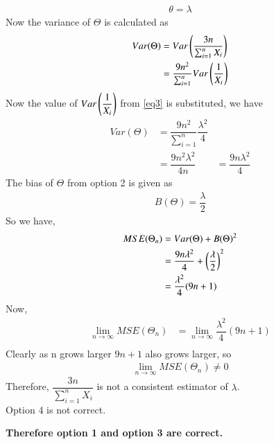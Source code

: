 \documentclass[journal,12pt,twocolumn]{IEEEtran}
\begin{document}
\begin{enumerate}
\begin{align}
     \theta = \lambda
 \end{align}
Now the variance of $ \Theta$ is calculated as
\begin{align}
    Var(\Theta) &= Var\left(\dfrac{3n}{\sum_{i=1}^{n} X_i } \right) \\
    & = \dfrac{9n^2}{ \sum_{i=1}^{n}} Var\left(\dfrac{1}{X_i}\right) \\
\end{align}
Now the value of $ Var\left(\dfrac{1}{X_i}\right) $ from \eqref{eq3} is substituted, we have
\begin{align}
     Var(\Theta) &= \dfrac{9n^2}{ \sum_{i=1}^{n}} \dfrac{\lambda^2}{4} \\
     & = \dfrac{9n^2 \lambda^2}{4n }
     & = \dfrac{9n \lambda^2}{4 }
\end{align}
The bias of $ \Theta $ from option 2 is given as
\begin{align}
    B(\Theta) = \dfrac{\lambda}{2}
\end{align}
So we have,
\begin{align}
    MSE(\Theta_n) &= Var(\Theta) + B(\Theta)^2 \\
    &= \dfrac{9n \lambda^2}{4 } + \left(\dfrac{\lambda}{2}\right)^2 \\
    & = \dfrac{ \lambda^2}{4 } (9n+1)
\end{align}
Now,
\begin{align}
     \lim_{n\to\infty} MSE( \Theta_n) &=    \lim_{n\to\infty} \dfrac{ \lambda^2}{4 } (9n+1) \\
\end{align}
Clearly as n grows larger $ 9n+1$ also grows larger, so
\begin{align}
     \lim_{n\to\infty} MSE( \Theta_n) \neq 0   
\end{align}
Therefore, $\dfrac{3n}{\sum_{i=1}^{n} X_i} $ is not a consistent estimator of $ \lambda$. \\
Option 4 is not correct. \\
\end{enumerate}
\textbf{Therefore option 1 and option 3 are correct.}
\end{document}
